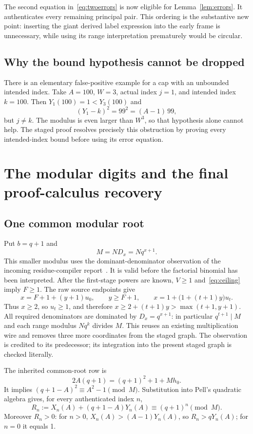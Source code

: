 \documentclass[11pt]{article}
\theoremstyle{definition}\newtheorem{definition}[theorem]{Definition}
\theoremstyle{remark}\newtheorem{remark}[theorem]{Remark}
\begin{document}
The second equation in~\eqref{eq:twoerrors} is now eligible for Lemma~\ref{lem:errors}. It authenticates every remaining principal pair. This ordering is the substantive new point: inserting the giant derived label expression into the early frame is unnecessary, while using its range interpretation prematurely would be circular.

\subsection{Why the bound hypothesis cannot be dropped}

There is an elementary false-positive example for a cap with an unbounded intended index. Take $A=100$, $W=3$, actual index $j=1$, and intended index $k=100$. Then $Y_1(100)=1<Y_3(100)$ and
\[
 (Y_1-k)^2=99^2=(A-1)\,99,
\]
but $j\ne k$. The modulus is even larger than $W^3$, so that hypothesis alone cannot help. The staged proof resolves precisely this obstruction by proving every intended-index bound before using its error equation.

\section{The modular digits and the final proof-calculus recovery}

\subsection{One common modular root}

Put $b=q+1$ and
\[
 M=ND_x=Nq^{x+1}.
\]
This smaller modulus uses the dominant-denominator observation of the incoming residue-compiler report~\cite{residue}. It is valid before the factorial binomial has been interpreted. After the first-stage powers are known, $V\ge1$ and~\eqref{eq:ceiling} imply $F\ge1$. The raw source endpoints give
\[
 x=F+1+(y+1)u_0,\qquad y\ge F+1,\qquad
 x=1+\bigl(1+(t+1)y\bigr)u_t.
\]
Thus $x\ge2$, so $u_t\ge1$, and therefore $x\ge2+(t+1)y>\max(t+1,y+1)$. All required denominators are dominated by $D_x=q^{x+1}$: in particular $q^{t+1}\mid M$ and each range modulus $Nq^k$ divides $M$. This reuses an existing multiplication wire and removes three more coordinates from the staged graph. The observation is credited to its predecessor; its integration into the present staged graph is checked literally.

The inherited common-root row is
\begin{equation}\label{eq:modroot}
 2A(q+1)=(q+1)^2+1+Mh_0.
\end{equation}
It implies $(q+1-A)^2\equiv A^2-1\pmod M$. Substitution into Pell's quadratic algebra gives, for every authenticated index $n$,
\begin{equation}\label{eq:modnumerator}
 R_n:=X_n(A)+(q+1-A)Y_n(A)\equiv(q+1)^n\pmod M.
\end{equation}
Moreover $R_n>0$: for $n>0$, $X_n(A)>(A-1)Y_n(A)$, so $R_n>qY_n(A)$; for $n=0$ it equals 1.
\end{document}
